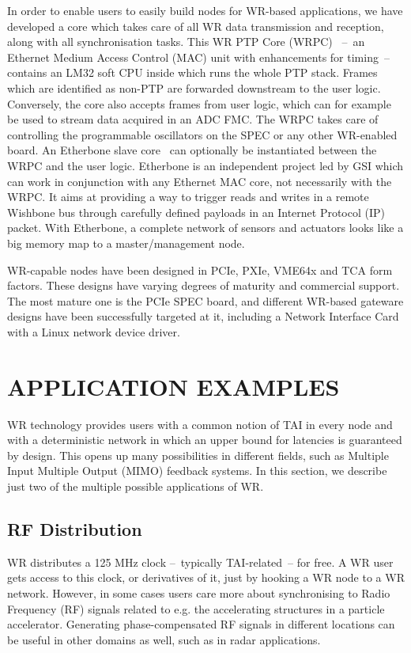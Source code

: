 \documentclass{../JAC2003}
\begin{document}
In order to enable users to easily build nodes for WR-based
applications, we have developed a core which takes care of all WR data
transmission and reception, along with all synchronisation tasks. This
WR PTP Core (WRPC)~\cite{wrpc-ref} --~an Ethernet Medium Access
Control (MAC) unit with enhancements for timing~-- contains an LM32
soft CPU inside which runs the whole PTP stack. Frames which are
identified as non-PTP are forwarded downstream to the user
logic. Conversely, the core also accepts frames from user logic, which
can for example be used to stream data acquired in an ADC FMC. The
WRPC takes care of controlling the programmable oscillators on the
SPEC or any other WR-enabled board. An Etherbone slave
core~\cite{etherbone-ref} can optionally be instantiated between the
WRPC and the user logic. Etherbone is an independent project led by
GSI which can work in conjunction with any Ethernet MAC core, not
necessarily with the WRPC. It aims at providing a way to trigger reads
and writes in a remote Wishbone bus through carefully defined payloads
in an Internet Protocol (IP) packet. With Etherbone, a complete
network of sensors and actuators looks like a big memory map to a
master/management node.

WR-capable nodes have been designed in PCIe, PXIe, VME64x and \textmu
TCA form factors. These designs have varying degrees of maturity and
commercial support. The most mature one is the PCIe SPEC board, and
different WR-based gateware designs have been successfully targeted
at it, including a Network Interface Card with a Linux network device
driver.

\section{APPLICATION EXAMPLES}

WR technology provides users with a common notion of TAI in every node
and with a deterministic network in which an upper bound for latencies
is guaranteed by design. This opens up many possibilities in different
fields, such as Multiple Input Multiple Output (MIMO) feedback
systems. In this section, we describe just two of the multiple
possible applications of WR.

\subsection{RF Distribution}

WR distributes a 125 MHz clock --~typically TAI-related~-- for free. A
WR user gets access to this clock, or derivatives of it, just by
hooking a WR node to a WR network. However, in some cases users care
more about synchronising to Radio Frequency (RF) signals related to
e.g. the accelerating structures in a particle accelerator. Generating
phase-compensated RF signals in different locations can be useful in
other domains as well, such as in radar applications.
\end{document}

